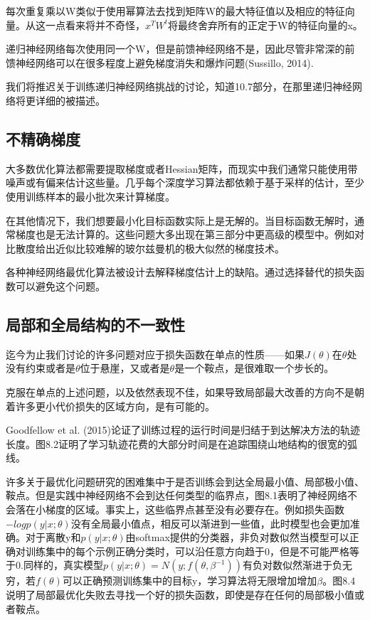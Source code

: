 每次重复乘以W类似于使用幂算法去找到矩阵W的最大特征值以及相应的特征向量。从这一点看来将并不奇怪，$x^TW^t$将最终舍弃所有的正定于W的特征向量的x。

递归神经网络每次使用同一个W，但是前馈神经网络不是，因此尽管非常深的前馈神经网络可以在很多程度上避免梯度消失和爆炸问题(Sussillo, 2014).

我们将推迟关于训练递归神经网络挑战的讨论，知道10.7部分，在那里递归神经网络将更详细的被描述。

\subsection{不精确梯度}

大多数优化算法都需要提取梯度或者Hessian矩阵，而现实中我们通常只能使用带噪声或有偏来估计这些量。几乎每个深度学习算法都依赖于基于采样的估计，至少使用训练样本的最小批次来计算梯度。

在其他情况下，我们想要最小化目标函数实际上是无解的。当目标函数无解时，通常梯度也是无法计算的。这些问题大多出现在第三部分中更高级的模型中。例如对比散度给出近似比较难解的玻尔兹曼机的极大似然的梯度技术。

各种神经网络最优化算法被设计去解释梯度估计上的缺陷。通过选择替代的损失函数可以避免这个问题。

\subsection{局部和全局结构的不一致性}

迄今为止我们讨论的许多问题对应于损失函数在单点的性质——如果$J(\theta)$在$\theta$处没有约束或者是$\theta$位于悬崖，又或者是$\theta$是一个鞍点，是很难取一个步长的。

克服在单点的上述问题，以及依然表现不佳，如果导致局部最大改善的方向不是朝着许多更小代价损失的区域方向，是有可能的。

Goodfellow et al. (2015)论证了训练过程的运行时间是归结于到达解决方法的轨迹长度。图8.2证明了学习轨迹花费的大部分时间是在追踪围绕山地结构的很宽的弧线。

许多关于最优化问题研究的困难集中于是否训练会到达全局最小值、局部极小值、鞍点。但是实践中神经网络不会到达任何类型的临界点，图8.1表明了神经网络不会落在小梯度的区域。事实上，这些临界点甚至没有必要存在。例如损失函数$-logp(y|x;\theta)$没有全局最小值点，相反可以渐进到一些值，此时模型也会更加准确。对于离散y和$p(y|x;\theta)$由softmax提供的分类器，非负对数似然当模型可以正确对训练集中的每个示例正确分类时，可以沿任意方向趋于0，但是不可能严格等于0.同样的，真实模型$p(y|x;\theta)=N(y;f(\theta,\beta^{-1}))$有负对数似然渐进于负无穷，若$f(\theta)$可以正确预测训练集中的目标y，学习算法将无限增加增加$\beta$。图8.4说明了局部最优化失败去寻找一个好的损失函数，即使是存在任何的局部极小值或者鞍点。


